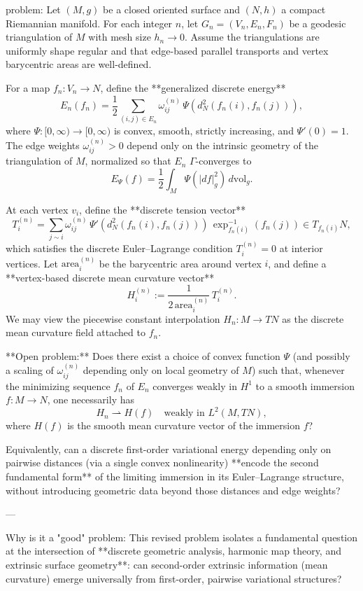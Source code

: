 problem:  
Let \( (M,g) \) be a closed oriented surface and \( (N,h) \) a compact Riemannian manifold.  
For each integer \(n\), let \(G_n = (V_n,E_n,F_n)\) be a geodesic triangulation of \(M\) with mesh size \(h_n \to 0\). Assume the triangulations are uniformly shape regular and that edge-based parallel transports and vertex barycentric areas are well-defined.  

For a map \(f_n : V_n \to N\), define the **generalized discrete energy**
\[
E_n(f_n) = \frac{1}{2} \sum_{(i,j)\in E_n} \omega_{ij}^{(n)} \, \Psi\!\left(d_N^2(f_n(i),f_n(j))\right),
\]
where \(\Psi:[0,\infty)\to[0,\infty)\) is convex, smooth, strictly increasing, and \( \Psi'(0)=1\).  The edge weights \(\omega_{ij}^{(n)}>0\) depend only on the intrinsic geometry of the triangulation of \(M\), normalized so that \(E_n\) $\Gamma$-converges to 
\[
E_\Psi(f) = \frac{1}{2}\int_M \Psi(|df|^2_g)\,d\mathrm{vol}_g .
\]

At each vertex \(v_i\), define the **discrete tension vector**
\[
T_i^{(n)} = \sum_{j\sim i} \omega_{ij}^{(n)}\, \Psi'\!\left(d_N^2(f_n(i),f_n(j))\right)\, \exp^{-1}_{f_n(i)}(f_n(j)) \in T_{f_n(i)}N,
\]
which satisfies the discrete Euler–Lagrange condition \(T_i^{(n)} = 0\) at interior vertices.  
Let \(\mathrm{area}_i^{(n)}\) be the barycentric area around vertex \(i\), and define a **vertex-based discrete mean curvature vector**
\[
H_i^{(n)} := \frac{1}{2\,\mathrm{area}_i^{(n)}} \, T_i^{(n)}.
\]
We may view the piecewise constant interpolation \(H_n: M\to TN\) as the discrete mean curvature field attached to \(f_n\).

**Open problem:**  
Does there exist a choice of convex function \(\Psi\) (and possibly a scaling of \(\omega_{ij}^{(n)}\) depending only on local geometry of \(M\)) such that, whenever the minimizing sequence \(f_n\) of \(E_n\) converges weakly in \(H^1\) to a smooth immersion \(f:M\to N\), one necessarily has
\[
H_n \rightharpoonup H(f) \quad\text{weakly in } L^2(M,TN),
\]
where \(H(f)\) is the smooth mean curvature vector of the immersion \(f\)?  

Equivalently, can a discrete first-order variational energy depending only on pairwise distances (via a single convex nonlinearity) **encode the second fundamental form** of the limiting immersion in its Euler–Lagrange structure, without introducing geometric data beyond those distances and edge weights?

---

Why is it a "good" problem:  
This revised problem isolates a fundamental question at the intersection of **discrete geometric analysis, harmonic map theory, and extrinsic surface geometry**: can second-order extrinsic information (mean curvature) emerge universally from first-order, pairwise variational structures?  


